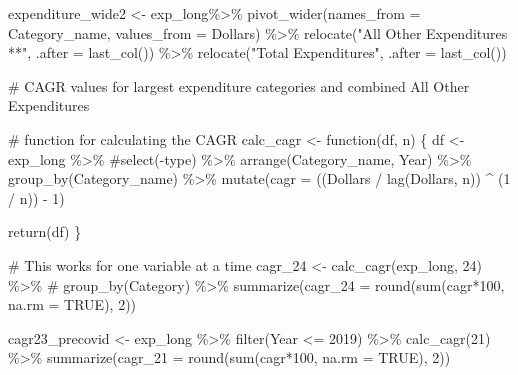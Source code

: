 \documentclass[
  letterpaper,
  DIV=11,
  numbers=noendperiod]{scrreport}
\newenvironment{Shaded}{\begin{snugshade}}{\end{snugshade}}
\newcommand{\AttributeTok}[1]{\textcolor[rgb]{0.40,0.45,0.13}{#1}}
\newcommand{\CommentTok}[1]{\textcolor[rgb]{0.37,0.37,0.37}{#1}}
\newcommand{\ConstantTok}[1]{\textcolor[rgb]{0.56,0.35,0.01}{#1}}
\newcommand{\ControlFlowTok}[1]{\textcolor[rgb]{0.00,0.23,0.31}{#1}}
\newcommand{\DecValTok}[1]{\textcolor[rgb]{0.68,0.00,0.00}{#1}}
\newcommand{\FunctionTok}[1]{\textcolor[rgb]{0.28,0.35,0.67}{#1}}
\newcommand{\NormalTok}[1]{\textcolor[rgb]{0.00,0.23,0.31}{#1}}
\newcommand{\OtherTok}[1]{\textcolor[rgb]{0.00,0.23,0.31}{#1}}
\newcommand{\SpecialCharTok}[1]{\textcolor[rgb]{0.37,0.37,0.37}{#1}}
\newcommand{\StringTok}[1]{\textcolor[rgb]{0.13,0.47,0.30}{#1}}
\begin{document}
\begin{Shaded}
\begin{Highlighting}[]
\NormalTok{expenditure\_wide2 }\OtherTok{\textless{}{-}}\NormalTok{ exp\_long}\SpecialCharTok{\%\textgreater{}\%} 
  \FunctionTok{pivot\_wider}\NormalTok{(}\AttributeTok{names\_from =}\NormalTok{ Category\_name, }
              \AttributeTok{values\_from =}\NormalTok{ Dollars) }\SpecialCharTok{\%\textgreater{}\%}
  \FunctionTok{relocate}\NormalTok{(}\StringTok{"All Other Expenditures **"}\NormalTok{, }\AttributeTok{.after =} \FunctionTok{last\_col}\NormalTok{()) }\SpecialCharTok{\%\textgreater{}\%}
  \FunctionTok{relocate}\NormalTok{(}\StringTok{"Total Expenditures"}\NormalTok{, }\AttributeTok{.after =}  \FunctionTok{last\_col}\NormalTok{())}


\CommentTok{\# CAGR values for largest expenditure categories and combined All Other Expenditures}

\CommentTok{\# function for calculating the CAGR}
\NormalTok{calc\_cagr }\OtherTok{\textless{}{-}} \ControlFlowTok{function}\NormalTok{(df, n) \{}
\NormalTok{  df }\OtherTok{\textless{}{-}}\NormalTok{ exp\_long }\SpecialCharTok{\%\textgreater{}\%}
    \CommentTok{\#select({-}type) \%\textgreater{}\%}
    \FunctionTok{arrange}\NormalTok{(Category\_name, Year) }\SpecialCharTok{\%\textgreater{}\%}
    \FunctionTok{group\_by}\NormalTok{(Category\_name) }\SpecialCharTok{\%\textgreater{}\%}
    \FunctionTok{mutate}\NormalTok{(}\AttributeTok{cagr =}\NormalTok{ ((}\StringTok{\textasciigrave{}}\AttributeTok{Dollars}\StringTok{\textasciigrave{}} \SpecialCharTok{/} \FunctionTok{lag}\NormalTok{(}\StringTok{\textasciigrave{}}\AttributeTok{Dollars}\StringTok{\textasciigrave{}}\NormalTok{, n)) }\SpecialCharTok{\^{}}\NormalTok{ (}\DecValTok{1} \SpecialCharTok{/}\NormalTok{ n)) }\SpecialCharTok{{-}} \DecValTok{1}\NormalTok{)}

  \FunctionTok{return}\NormalTok{(df)}
\NormalTok{\}}

\CommentTok{\# This works for one variable at a time}
\NormalTok{cagr\_24 }\OtherTok{\textless{}{-}} \FunctionTok{calc\_cagr}\NormalTok{(exp\_long, }\DecValTok{24}\NormalTok{) }\SpecialCharTok{\%\textgreater{}\%} 
  \CommentTok{\# group\_by(Category) \%\textgreater{}\%}
  \FunctionTok{summarize}\NormalTok{(}\AttributeTok{cagr\_24 =} \FunctionTok{round}\NormalTok{(}\FunctionTok{sum}\NormalTok{(cagr}\SpecialCharTok{*}\DecValTok{100}\NormalTok{, }\AttributeTok{na.rm =} \ConstantTok{TRUE}\NormalTok{), }\DecValTok{2}\NormalTok{))}

\NormalTok{cagr23\_precovid }\OtherTok{\textless{}{-}}\NormalTok{ exp\_long }\SpecialCharTok{\%\textgreater{}\%}
  \FunctionTok{filter}\NormalTok{(Year }\SpecialCharTok{\textless{}=} \DecValTok{2019}\NormalTok{) }\SpecialCharTok{\%\textgreater{}\%}
  \FunctionTok{calc\_cagr}\NormalTok{(}\DecValTok{21}\NormalTok{) }\SpecialCharTok{\%\textgreater{}\%} 
  \FunctionTok{summarize}\NormalTok{(}\AttributeTok{cagr\_21 =} \FunctionTok{round}\NormalTok{(}\FunctionTok{sum}\NormalTok{(cagr}\SpecialCharTok{*}\DecValTok{100}\NormalTok{, }\AttributeTok{na.rm =} \ConstantTok{TRUE}\NormalTok{), }\DecValTok{2}\NormalTok{))}




\end{Highlighting}
\end{Shaded}
\end{document}
